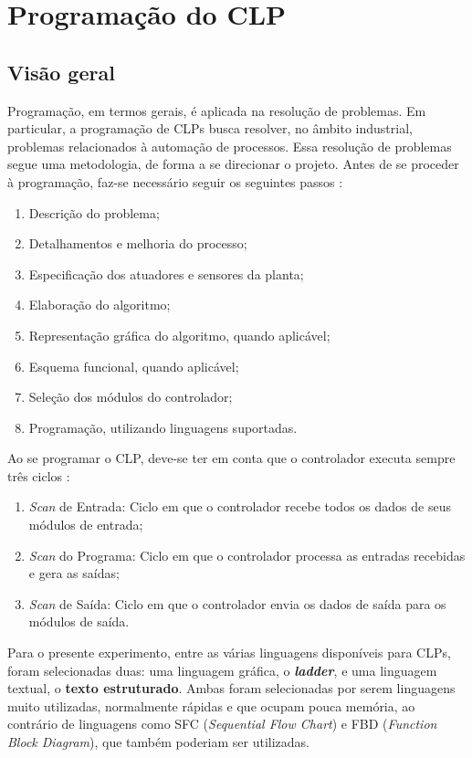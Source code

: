 \section{Programação do CLP}
\subsection{Visão geral}
Programação, em termos gerais, é aplicada na resolução de problemas. Em particular, a programação de CLPs busca resolver, no âmbito industrial, problemas relacionados à automação de processos. Essa resolução de problemas segue uma metodologia, de forma a se direcionar o projeto. Antes de se proceder à programação, faz-se necessário seguir os seguintes passos \cite{rockwellAutomation}:
\begin{enumerate}
  \item Descrição do problema;
  \item Detalhamentos e melhoria do processo;
  \item Especificação dos atuadores e sensores da planta;
  \item Elaboração do algoritmo;
  \item Representação gráfica do algoritmo, quando aplicável;
  \item Esquema funcional, quando aplicável;
  \item Seleção dos módulos do controlador;
  \item Programação, utilizando linguagens suportadas.
\end{enumerate}

Ao se programar o CLP, deve-se ter em conta que o controlador executa sempre três ciclos \cite{rockwellAutomation}:
\begin{enumerate}
  \item \textit{Scan} de Entrada: Ciclo em que o controlador recebe todos os dados de seus módulos de entrada;
  \item \textit{Scan} do Programa: Ciclo em que o controlador processa as entradas recebidas e gera as saídas;
  \item \textit{Scan} de Saída: Ciclo em que o controlador envia os dados de saída para os módulos de saída.
\end{enumerate}

Para o presente experimento, entre as várias linguagens disponíveis para CLPs, foram selecionadas duas: uma linguagem gráfica, o \textbf{\textit{ladder}}, e uma linguagem textual, o \textbf{texto estruturado}. Ambas foram selecionadas por serem linguagens muito utilizadas, normalmente rápidas e que ocupam pouca memória, ao contrário de linguagens como SFC (\textit{Sequential Flow Chart}) e FBD (\textit{Function Block Diagram}), que também poderiam ser utilizadas.

